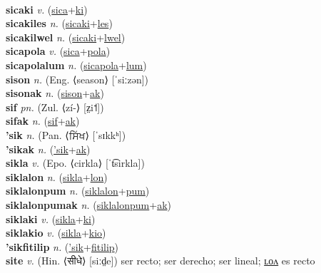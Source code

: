  \label{sicalwelkiah} \\
\textbf{sicaki} \textit{v.} (\hyperref[sica]{sica}+\hyperref[ki]{ki})
 \label{sicaki} \\
\textbf{sicakiles} \textit{n.} (\hyperref[sicaki]{sicaki}+\hyperref[les]{les})
 \label{sicakiles} \\
\textbf{sicakilwel} \textit{n.} (\hyperref[sicaki]{sicaki}+\hyperref[lwel]{lwel})
 \label{sicakilwel} \\
\textbf{sicapola} \textit{v.} (\hyperref[sica]{sica}+\hyperref[pola]{pola})
 \label{sicapola} \\
\textbf{sicapolalum} \textit{n.} (\hyperref[sicapola]{sicapola}+\hyperref[lum]{lum})
 \label{sicapolalum} \\
\textbf{sison} \textit{n.} (Eng. ⟨season⟩ [ˈsiːzən])
 \label{sison} \\
\textbf{sisonak} \textit{n.} (\hyperref[sison]{sison}+\hyperref[ak]{ak})
 \label{sisonak} \\
\textbf{sif} \textit{pn.} (Zul. ⟨zí-⟩ [z̤i˦])
 \label{sif} \\
\textbf{sifak} \textit{n.} (\hyperref[sif]{sif}+\hyperref[ak]{ak})
 \label{sifak} \\
\textbf{'sik} \textit{n.} (Pan. ⟨ਸਿੱਖ⟩ [ˈsɪkkʰ])
 \label{'sik} \\
\textbf{'sikak} \textit{n.} (\hyperref['sik]{'sik}+\hyperref[ak]{ak})
 \label{'sikak} \\
\textbf{sikla} \textit{v.} (Epo. ⟨cirkla⟩ [ˈt͡sirkla])
 \label{sikla} \\
\textbf{siklalon} \textit{n.} (\hyperref[sikla]{sikla}+\hyperref[lon]{lon})
 \label{siklalon} \\
\textbf{siklalonpum} \textit{n.} (\hyperref[siklalon]{siklalon}+\hyperref[pum]{pum})
 \label{siklalonpum} \\
\textbf{siklalonpumak} \textit{n.} (\hyperref[siklalonpum]{siklalonpum}+\hyperref[ak]{ak})
 \label{siklalonpumak} \\
\textbf{siklaki} \textit{v.} (\hyperref[sikla]{sikla}+\hyperref[ki]{ki})
 \label{siklaki} \\
\textbf{siklakio} \textit{v.} (\hyperref[sikla]{sikla}+\hyperref[kio]{kio})
 \label{siklakio} \\
\textbf{'sikfitilip} \textit{n.} (\hyperref['sik]{'sik}+\hyperref[fitilip]{fitilip})
 \label{'sikfitilip} \\
\textbf{site} \textit{v.} (Hin. ⟨सीधे⟩ [siːd̤e])
ser recto; ser derecho; ser lineal; \hyperref[sitelon]{ʟᴏᴧ} es recto \label{site} \\
